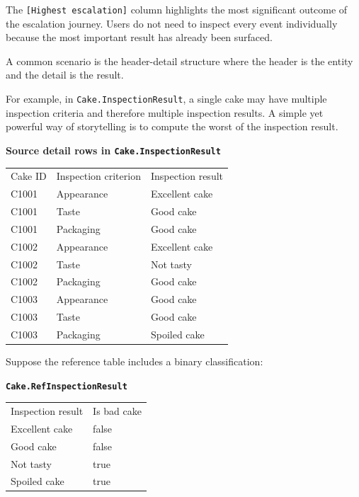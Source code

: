\documentclass[10pt,openany,10pt]{book}
\newcounter{none}
\let\podeToprule\toprule
\let\podeMidrule\midrule
\let\podeBottomrule\bottomrule
\renewcommand{\toprule}{\arrayrulecolor{pbiGrid}\podeToprule}
\renewcommand{\midrule}{\arrayrulecolor{pbiGrid}\podeMidrule}
\renewcommand{\bottomrule}{\arrayrulecolor{pbiGrid}\podeBottomrule}
\begin{document}
The \texttt{{[}Highest\ escalation{]}} column highlights the most
significant outcome of the escalation journey. Users do not need to
inspect every event individually because the most important result has
already been surfaced.

A common scenario is the header-detail structure where the header is the
entity and the detail is the result.

For example, in \texttt{Cake.InspectionResult}, a single cake may have
multiple inspection criteria and therefore multiple inspection results.
A simple yet powerful way of storytelling is to compute the worst of the
inspection result.

\textbf{Source detail rows in \texttt{Cake.InspectionResult}}

{\def\LTcaptype{none} %
\begin{longtable}[]{@{}lll@{}}
\toprule\noalign{}
Cake ID & Inspection criterion & Inspection result \\
\midrule\noalign{}
\endhead
\bottomrule\noalign{}
\endlastfoot
C1001 & Appearance & Excellent cake \\
C1001 & Taste & Good cake \\
C1001 & Packaging & Good cake \\
C1002 & Appearance & Excellent cake \\
C1002 & Taste & Not tasty \\
C1002 & Packaging & Good cake \\
C1003 & Appearance & Good cake \\
C1003 & Taste & Good cake \\
C1003 & Packaging & Spoiled cake \\
\end{longtable}
}

Suppose the reference table includes a binary classification:

\textbf{\texttt{Cake.RefInspectionResult}}

{\def\LTcaptype{none} %
\begin{longtable}[]{@{}ll@{}}
\toprule\noalign{}
Inspection result & Is bad cake \\
\midrule\noalign{}
\endhead
\bottomrule\noalign{}
\endlastfoot
Excellent cake & false \\
Good cake & false \\
Not tasty & true \\
Spoiled cake & true \\
\end{longtable}
}
\end{document}
